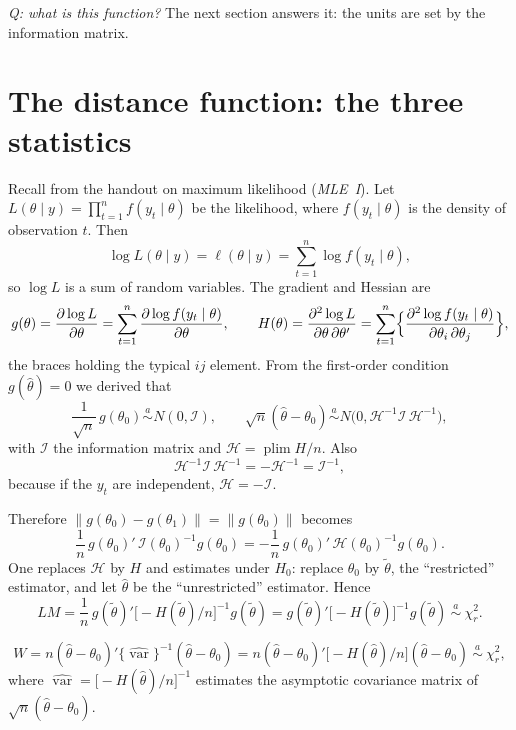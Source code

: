 \documentclass[11pt]{article}
\begin{document}
\emph{Q: what is this function?} The next section answers it: the units are set by the information matrix.

\section{The distance function: the three statistics}

Recall from the handout on maximum likelihood (\emph{MLE~I}). Let
$L(\theta\mid y)=\prod_{t=1}^{n}f(y_{t}\mid\theta)$ be the likelihood, where $f(y_{t}\mid\theta)$ is the density
of observation $t$. Then
\[ \log L(\theta\mid y)=\ell(\theta\mid y)=\sum_{t=1}^{n}\log f(y_{t}\mid\theta), \]
so $\log L$ is a sum of random variables. The gradient and Hessian are
\[ g(\theta)=\frac{\partial\log L}{\partial\theta}=\sum_{t=1}^{n}\frac{\partial\log f(y_{t}\mid\theta)}{\partial\theta},
   \qquad
   H(\theta)=\frac{\partial^{2}\log L}{\partial\theta\,\partial\theta'}
   =\sum_{t=1}^{n}\Bigl\{\frac{\partial^{2}\log f(y_{t}\mid\theta)}{\partial\theta_{i}\,\partial\theta_{j}}\Bigr\}, \]
the braces holding the typical $ij$ element. From the first-order condition $g(\hat\theta)=0$ we derived that
\[ \frac1{\sqrt n}\,g(\theta_{0})\overset{a}{\sim}N(0,\mathcal I),
   \qquad
   \sqrt n(\hat\theta-\theta_{0})\overset{a}{\sim}N\bigl(0,\mathcal H^{-1}\mathcal I\,\mathcal H^{-1}\bigr), \]
with $\mathcal I$ the information matrix and $\mathcal H=\operatorname{plim}H/n$. Also
\[ \mathcal H^{-1}\mathcal I\,\mathcal H^{-1}=-\mathcal H^{-1}=\mathcal I^{-1}, \]
because if the $y_{t}$ are independent, $\mathcal H=-\mathcal I$.

Therefore $\lVert g(\theta_{0})-g(\theta_{1})\rVert=\lVert g(\theta_{0})\rVert$ becomes
\[ \frac1n\,g(\theta_{0})'\,\mathcal I(\theta_{0})^{-1}g(\theta_{0})
   =-\frac1n\,g(\theta_{0})'\,\mathcal H(\theta_{0})^{-1}g(\theta_{0}). \]
One replaces $\mathcal H$ by $H$ and estimates under $H_{0}$: replace $\theta_{0}$ by $\tilde\theta$, the
``restricted'' estimator, and let $\hat\theta$ be the ``unrestricted'' estimator. Hence
\[ LM=\frac1n\,g(\tilde\theta)'\bigl[-H(\tilde\theta)/n\bigr]^{-1}g(\tilde\theta)
   =g(\tilde\theta)'\bigl[-H(\tilde\theta)\bigr]^{-1}g(\tilde\theta)\ \overset{a}{\sim}\ \chi^{2}_{r}. \]

\[ W=n(\hat\theta-\theta_{0})'\{\widehat{\operatorname{var}}\}^{-1}(\hat\theta-\theta_{0})
   =n(\hat\theta-\theta_{0})'\bigl[-H(\hat\theta)/n\bigr](\hat\theta-\theta_{0})\ \overset{a}{\sim}\ \chi^{2}_{r}, \]
where $\widehat{\operatorname{var}}=\bigl[-H(\hat\theta)/n\bigr]^{-1}$ estimates the asymptotic covariance matrix of
$\sqrt n(\hat\theta-\theta_{0})$.
\end{document}
